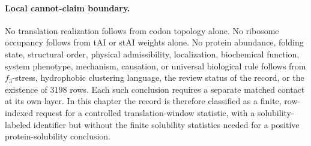 \paragraph{Local cannot-claim boundary.}
No translation realization follows from codon topology alone.  No ribosome occupancy follows from tAI or stAI weights alone.  No protein abundance, folding state, structural order, physical admissibility, localization, biochemical function, system phenotype, mechanism, causation, or universal biological rule follows from $f_3$-stress, hydrophobic clustering language, the review status of the record, or the existence of $3198$ rows.  Each such conclusion requires a separate matched contact at its own layer.  In this chapter the record is therefore classified as a finite, row-indexed request for a controlled translation-window statistic, with a solubility-labeled identifier but without the finite solubility statistics needed for a positive protein-solubility conclusion.